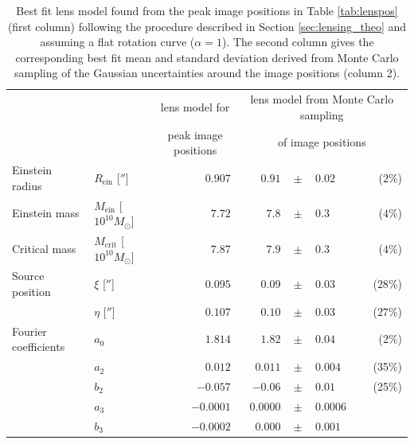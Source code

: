 \begin{table}
\centering
\caption{Best fit lens model found from the peak image positions in Table \ref{tab:lenspos} (first column) following the procedure described in Section \ref{sec:lensing_theo} and assuming a flat rotation curve ($\alpha = 1$). The second column gives the corresponding best fit mean and standard deviation derived from Monte Carlo sampling of the Gaussian uncertainties around the image positions (column 2).}
\begin{tabular}{llrrclr}
\hline
 &  & \multicolumn{1}{c}{lens model for} &\multicolumn{4}{c}{lens model from Monte Carlo sampling  } \\
 &  & \multicolumn{1}{c}{peak image positions}  & \multicolumn{4}{c}{of image positions }  \\ \hline
Einstein radius      & $R_\text{ein}$ [$''$]             & $0.907$ & $0.91$  & $\pm$ & $     0.02$ & ($2\%$)\\
Einstein mass        & $M_\text{ein}$ [$10^{10} M_\odot$]  & $7.72$  & $7.8 $  & $\pm$ & $      0.3$ & ($4\%$) \\
Critical mass        & $M_\text{crit}$ [$10^{10} M_\odot$] & $7.87$  & $7.9$   & $\pm$ & $      0.3$ & ($4\%$)\\
Source position      & $\xi$ [$''$]                      & $0.095$ & $0.09 $ & $\pm$ & $     0.03$ & ($28\%$)\\
                     & $\eta$ [$''$]                     & $0.107$ & $0.10 $ & $\pm$ & $     0.03$ & ($27\%$)\\
Fourier coefficients & $a_0$                               & $1.814$ & $1.82 $ & $\pm$ & $   0.04$ & (2\%)\\
                     & $a_2$                               & $0.012$ & $ 0.011 $ & $\pm$ & $    0.004$ & (35\%)\\
                     & $b_2$                               & $-0.057$ & $-0.06 $  & $\pm$ & $  0.01$ & (25\%)\\
                     & $a_3$                               & $-0.0001$& $0.0000 $ & $\pm$ & $   0.0006$ & \\
                     & $b_3$                               & $-0.0002$&$0.000 $   & $\pm$ & $  0.001$ & \\\hline
\end{tabular}  
\label{tab:bestfitlensmodel} 
\end{table}



